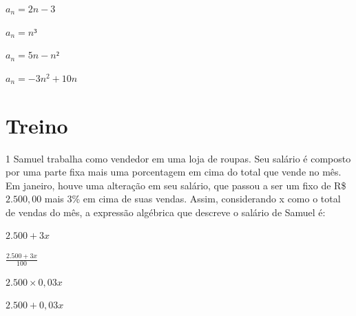 \begin{escolha}[itemsep=0pt]
    \item $a_{n} = 2n - 3$ \\

    \item $a_{n} = n³$

    \item $a_{n} = 5n - n²$

    \item $a_{n} = - 3n^{2} + 10n$

\end{escolha}

\section*{Treino}

\num{1} Samuel trabalha como vendedor em uma loja de roupas. Seu salário é
composto por uma parte fixa mais uma porcentagem em cima do total que
vende no mês. Em janeiro, houve uma alteração em seu salário, que passou
a ser um fixo de R\$ $2.500,00$ mais 3\% em cima de suas vendas. Assim,
considerando x como o total de vendas do mês, a expressão algébrica
que descreve o salário de Samuel é:


\begin{multicols}{2}
\begin{escolha}[itemsep=0pt]
  \item $2.500 + 3x$
  \item $\frac{2.500 + 3x}{100}$
  \item $2.500 \times 0,03x$
  \item $2.500 + 0,03x$
\end{escolha}
\end{multicols}

